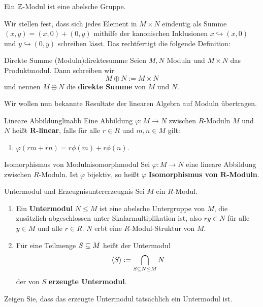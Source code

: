 \begin{übung}
Ein $\mathbb{Z}$-Modul ist eine abelsche Gruppe.
\end{übung}
Wir stellen fest, dass sich jedes Element in $M \times N$ eindeutig als Summe $(x,y) = (x,0)+(0,y)$ mithilfe der kanonischen Inklusionen $x \hookrightarrow (x,0)$ und $y \hookrightarrow (0,y)$ schreiben lässt. Das rechtfertigt die folgende Definition:
\begin{definition}{Direkte Summe (Moduln)}{direktesumme}
Seien $M,N$ Moduln und $M\times N$ das Produktmodul. Dann schreiben wir 
\begin{equation}
M \oplus N := M \times N
\end{equation}
und nennen $M \oplus N$ die \textbf{direkte Summe} von $M$ und $N$.
\end{definition}
Wir wollen nun bekannte Resultate der linearen Algebra auf Moduln übertragen.
\begin{definition}{Lineare Abbildung}{linabb}
Eine Abbildung $\varphi: M \to N$ zwischen $R$-Moduln $M$ und $N$ heißt \textbf{$\mathbf{R}$-linear}, falls für alle $r\in R$ und $m,n \in M$ gilt:
\begin{enumerate}[({L}1)]
\item $\varphi(rm+rn) = r \phi(m) + r \phi(n).$
\end{enumerate}
\end{definition}
\begin{definition}{Isomorphismus von Moduln}{isomorphmodul}
Sei $\varphi: M \to N$ eine lineare Abbildung zwischen $R$-Moduln. Ist $\varphi$ bijektiv, so heißt $\varphi$ \textbf{Isomorphismus von $\mathbf{R}$-Moduln}. 
\end{definition}
\begin{definition}{Untermodul und Erzeugnis}{untererzeugnis}
Sei $M$ ein $R$-Modul.
\begin{enumerate}
\item Ein \textbf{Untermodul} $N \leq M$ ist eine abelsche Untergruppe von $M$, die zusätzlich abgeschlossen unter Skalarmultiplikation ist, also $ry \in N$ für alle $y \in M$ und alle $r \in R$. $N$ erbt eine $R$-Modul-Struktur von $M$.
\item Für eine Teilmenge $S \subseteq M$ heißt der Untermodul
\begin{equation}
\langle S \rangle := \bigcap_{S \subseteq N \leq M} N
\end{equation}
der von $S$ \textbf{erzeugte Untermodul}.
\end{enumerate}
\end{definition}
\begin{übung}
Zeigen Sie, dass das erzeugte Untermodul tatsächlich ein Untermodul ist.
\end{übung}

